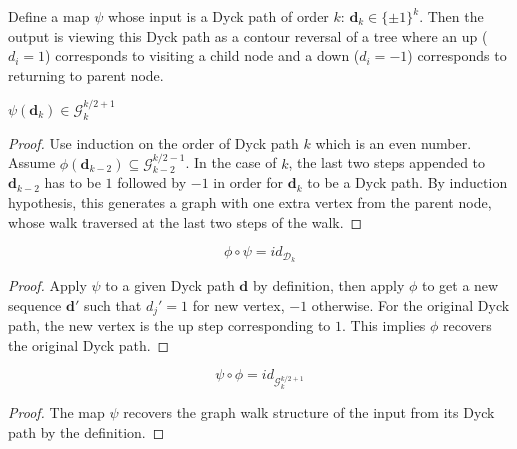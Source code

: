 \begin{definition}
  \notready
  \label{def:Dyck_to_graph_map}
  Define a map $\psi$ whose input is a Dyck path of order $k$: $\mathbf{d}_k \in \{\pm1\}^k$. Then the output is viewing
  this Dyck path as a contour reversal of a tree where an up ($d_i = 1$) corresponds to visiting a child node
  and a down ($d_i = -1$) corresponds to returning to parent node.
\end{definition}


\begin{lemma}
  \notready
  \label{lem:Dyck_graph_correspondence}
  $\psi(\mathbf{d}_k) \in \mathcal{G}^{k/2 + 1}_k$
\end{lemma}

\begin{proof}
  \notready
  Use induction on the order of Dyck path $k$ which is an even number. Assume $\phi(\mathbf{d}_{k-2})
  \subseteq \mathcal{G}_{k-2}^{k/2 -1}$. In the case of $k$, the last two steps appended to $\mathbf{d}_{k-2}$
  has to be $1$ followed by $-1$ in order for $\mathbf{d}_k$ to be a Dyck path. By induction hypothesis,
  this generates a graph with one extra vertex from the parent node, whose walk traversed at the last two steps of the walk.
\end{proof}


\begin{lemma}
  \notready
  \label{lem:composition1}
  $$\phi \circ \psi = id_{\mathcal{D}_k}$$
\end{lemma}

\begin{proof}
  \notready
  Apply $\psi$ to a given Dyck path $\mathbf{d}$ by definition, then apply $\phi$ to get a new sequence
  $\mathbf{d}'$ such that $d_j' = 1$ for new vertex, $-1$ otherwise. For the original Dyck path, the new
  vertex is the up step corresponding to $1$. This implies $\phi$ recovers the original Dyck path.
\end{proof}


\begin{lemma}
  \notready
  \label{lem:composition2}
  $$\psi \circ \phi = id_{\mathcal{G}^{k/2 + 1}_k}$$
\end{lemma}

\begin{proof}
  \notready
  The map $\psi$ recovers the graph walk structure of the input from its Dyck path by the definition.
\end{proof}


